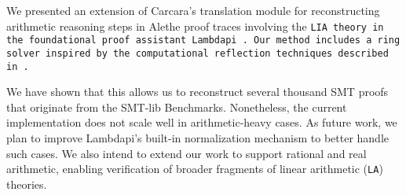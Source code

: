 \documentclass[runningheads]{llncs}
\begin{document}
We presented an extension of Carcara's \cite{carcara} translation module \cite{ColtellacciMD24} for reconstructing arithmetic reasoning steps in Alethe proof traces involving the \tt{LIA} theory in the foundational proof assistant Lambdapi \cite{lambdapi}.
Our method includes a ring solver inspired by the computational reflection techniques described in \cite{reflection-origin-coq,ring-coq}.

We have shown that this allows us to reconstruct several thousand SMT proofs that originate from the SMT-lib Benchmarks.
Nonetheless, the current implementation does not scale well in arithmetic-heavy cases.
As future work, we plan to improve Lambdapi’s built-in normalization mechanism to better handle such cases.
We also intend to extend our work to support rational and real arithmetic, enabling verification of broader fragments of linear arithmetic (\texttt{LA}) theories.





\end{document}
